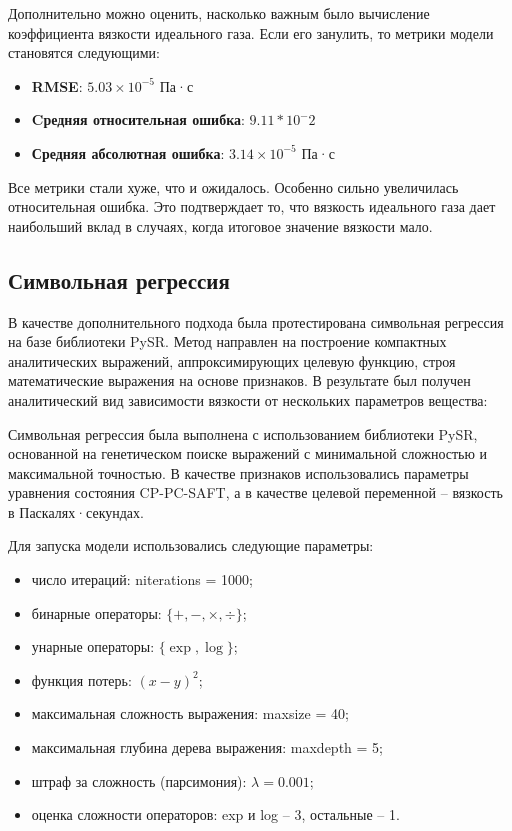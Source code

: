 \documentclass[a4paper,12pt]{article}
\begin{document}
    Дополнительно можно оценить, насколько важным было вычисление коэффициента вязкости идеального газа. Если его занулить, то метрики модели становятся следующими:
    \begin{itemize}
      \item \textbf{RMSE}: \(5.03 \times 10^{-5} \) Па·с
      \item \textbf{Cредняя относительная ошибка}: \(9.11*10^-2\)
      \item \textbf{Средняя абсолютная ошибка}: \(3.14 \times 10^{-5} \) Па·с \end{itemize}

    Все метрики стали хуже, что и ожидалось. Особенно сильно увеличилась относительная ошибка. Это подтверждает то, что вязкость идеального газа дает наибольший вклад в случаях, когда итоговое значение вязкости мало.

  \subsection{Символьная регрессия}

    В качестве дополнительного подхода была протестирована символьная регрессия на базе библиотеки PySR. Метод направлен на построение компактных аналитических выражений, аппроксимирующих целевую функцию, строя математические выражения на основе признаков. В результате был получен аналитический вид зависимости вязкости от нескольких параметров вещества:

    Символьная регрессия была выполнена с использованием библиотеки PySR, основанной на генетическом поиске выражений с минимальной сложностью и максимальной точностью. В качестве признаков использовались параметры уравнения состояния CP-PC-SAFT, а в качестве целевой переменной -- вязкость в Паскалях·секундах.

Для запуска модели использовались следующие параметры:

\begin{itemize}
  \item число итераций: niterations = 1000;
  \item бинарные операторы: \( \{+, -, \times, \div \} \);
  \item унарные операторы: \( \{\exp, \log\} \);
  \item функция потерь: \( (x - y)^2 \);
  \item максимальная сложность выражения: maxsize = 40;
  \item максимальная глубина дерева выражения: maxdepth = 5;
  \item штраф за сложность (парсимония): \( \lambda = 0.001 \);
  \item оценка сложности операторов: exp и log -- 3, остальные -- 1.
\end{itemize}
\end{document}
